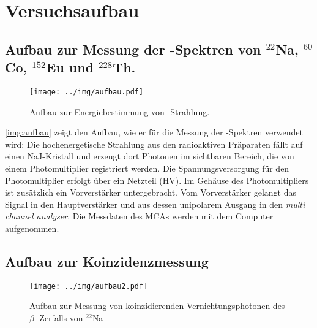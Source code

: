 \section{Versuchsaufbau}

\subsection{Aufbau zur Messung der \textgamma-Spektren von \texorpdfstring{${}^{22}$Na, ${}^{60}$Co, ${}^{152}$Eu und ${}^{228}$Th}{22-Na, 60-Co, 152-Eu und 228-Th}.}

\begin{figure}[H]
\begin{center}
  \texttt{[image: ../img/aufbau.pdf]}
  \caption[---]{Aufbau zur Energiebestimmung von \textgamma-Strahlung.}
  \label{img:aufbau}
\end{center}
\end{figure}

\autoref{img:aufbau} zeigt den Aufbau, wie er für die Messung der \textgamma-Spektren verwendet wird:
Die hochenergetische Strahlung aus den radioaktiven Präparaten fällt auf einen NaJ-Kristall und
erzeugt dort Photonen im sichtbaren Bereich, die von einem Photomultiplier registriert werden.
Die Spannungsversorgung für den Photomultiplier erfolgt über ein Netzteil (HV).
Im Gehäuse des Photomultipliers ist zusätzlich ein Vorverstärker untergebracht.
Vom Vorverstärker gelangt das Signal in den Hauptverstärker und aus dessen unipolarem Ausgang
in den \emph{multi channel analyser}.
Die Messdaten des MCAs werden mit dem Computer aufgenommen.


\subsection{Aufbau zur Koinzidenzmessung}

\begin{figure}[H]
\begin{center}
  \texttt{[image: ../img/aufbau2.pdf]}
  \caption[---]{Aufbau zur Messung von koinzidierenden Vernichtungsphotonen
  des $\beta^-$Zerfalls von ${}^{22}$Na}
  \label{img:aufbau2}
\end{center}
\end{figure}


